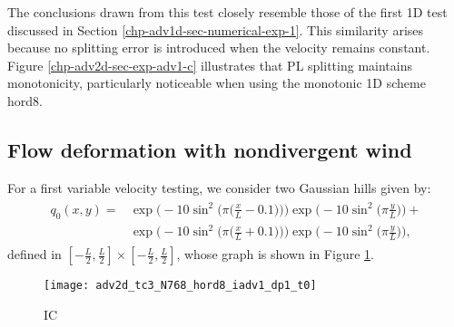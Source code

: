 The conclusions drawn from this test closely resemble those of the first 1D test discussed in Section \ref{chp-adv1d-sec-numerical-exp-1}.
This similarity arises because no splitting error is introduced when the velocity remains constant.
Figure \ref{chp-adv2d-sec-exp-adv1-c} illustrates that PL splitting maintains monotonicity, particularly noticeable when using the monotonic 1D scheme hord8.

\subsection{Flow deformation with nondivergent wind}
For a first variable velocity testing, we consider two Gaussian hills given by:
\begin{align}
	\begin{split}
	\label{chp-adv2d-ic2}
	q_0(x,y) = &\exp\bigg(-10\sin^2 \bigg(\pi \bigg(\frac{x}{L}-0.1\bigg)\bigg)\bigg) \exp\bigg(-10\sin^2 \bigg(\pi \frac{y}{L}\bigg) \bigg)+ \\
	           &\exp\bigg(-10\sin^2 \bigg(\pi \bigg(\frac{x}{L}+0.1\bigg)\bigg)\bigg) \exp\bigg(-10\sin^2 \bigg(\pi \frac{y}{L}\bigg) \bigg),
	\end{split}
\end{align}
defined in $[-\frac{L}{2},\frac{L}{2}] \times [-\frac{L}{2},\frac{L}{2}]$, whose graph is shown in Figure \ref{chp-adv2d-sec-exp-adv2-ic}.
\begin{figure}[!htb]
	\centering
	\texttt{[image: adv2d\_tc3\_N768\_hord8\_iadv1\_dp1\_t0]}
	\caption{IC\label{chp-adv2d-sec-exp-adv2-ic}}
\end{figure}

